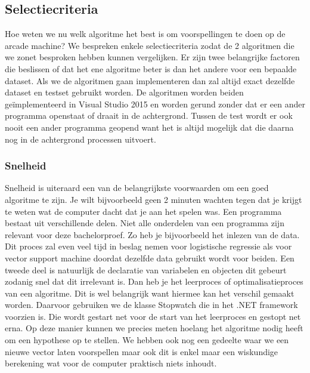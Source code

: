 \subsection{Selectiecriteria}
\label{sec:Selectiecriteria}
Hoe weten we nu welk algoritme het best is om voorspellingen te doen op de arcade machine? We bespreken enkele selectiecriteria zodat de 2 algoritmen die we zonet besproken hebben kunnen vergelijken. 
Er zijn twee belangrijke factoren die beslissen of dat het ene algoritme beter is dan het andere voor een bepaalde dataset. 
Als we de algoritmen gaan implementeren dan zal altijd exact dezelfde dataset en testset gebruikt worden. De algoritmen worden beiden geïmplementeerd in Visual Studio 2015 en worden gerund zonder dat er een ander programma openstaat of draait in de achtergrond. Tussen de test wordt er ook nooit een ander programma geopend want het is altijd mogelijk dat die daarna nog in de achtergrond processen uitvoert. 

\subsubsection{Snelheid}
Snelheid is uiteraard een van de belangrijkste voorwaarden om een goed algoritme te zijn. Je wilt bijvoorbeeld geen 2 minuten wachten tegen dat je krijgt te weten wat de computer dacht dat je aan het spelen was. Een programma bestaat uit verschillende delen. Niet alle onderdelen van een programma zijn relevant voor deze bachelorproef. Zo heb je bijvoorbeeld het inlezen van de data. Dit proces zal even veel tijd in beslag nemen voor logistische regressie als voor vector support machine doordat dezelfde data gebruikt wordt voor beiden. Een tweede deel is natuurlijk de declaratie van variabelen en objecten dit gebeurt zodanig snel dat dit irrelevant is.\newline
Dan heb je het leerproces of optimalisatieproces van een algoritme. Dit is wel belangrijk want hiermee kan het verschil gemaakt worden. Daarvoor gebruiken we de klasse Stopwatch die in het .NET framework voorzien is. Die wordt gestart net voor de start van het leerproces en gestopt net erna. Op deze manier kunnen we precies meten hoelang het algoritme nodig heeft om een hypothese op te stellen. \newline
We hebben ook nog een gedeelte waar we een nieuwe vector laten voorspellen maar ook dit is enkel maar een wiskundige berekening wat voor de computer praktisch niets inhoudt. 

